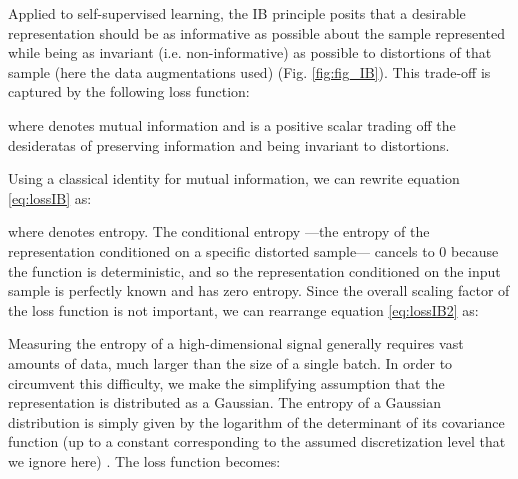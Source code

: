 \documentclass{article}
\begin{document}
Applied to self-supervised learning, the IB principle posits that a desirable representation should be as informative as possible about the sample represented while being as invariant (i.e. non-informative) as possible to distortions of that sample (here the data augmentations used) (Fig. \ref{fig:fig_IB}). This trade-off is captured by the following loss function:



where  denotes mutual information and  is a positive scalar trading off the desideratas of preserving information and being invariant to distortions.

Using a classical identity for mutual information, we can rewrite equation \ref{eq:lossIB} as:



where  denotes entropy. The conditional entropy  ---the entropy of the representation conditioned on a specific distorted sample--- cancels to 0 because the function  is deterministic, and so the representation  conditioned on the input sample  is perfectly known and has zero entropy. Since the overall scaling factor of the loss function is not important, we can rearrange equation \ref{eq:lossIB2} as: 



Measuring the entropy of a high-dimensional signal generally requires vast amounts of data, much larger than the size of a single batch. In order to circumvent this difficulty, we make the simplifying assumption that the representation  is distributed as a Gaussian. The entropy of a Gaussian distribution is simply given by the logarithm of the determinant of its covariance function (up to a constant corresponding to the assumed discretization level that we ignore here) \cite{cai_law_2015}. The loss function becomes:  
\end{document}

